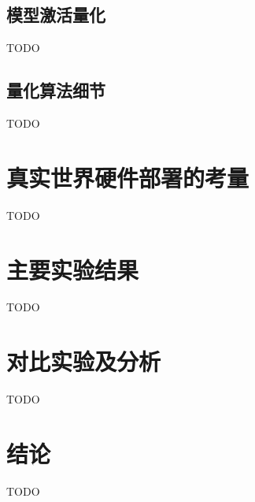 \subsection{模型激活量化}
TODO
\subsection{量化算法细节}
TODO

\section{真实世界硬件部署的考量}
TODO

\section{主要实验结果}
TODO

\section{对比实验及分析}
TODO

\section{结论}
TODO
